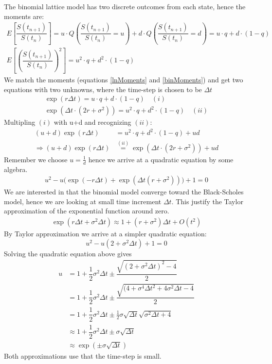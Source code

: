 The binomial lattice model has two discrete outcomes from each state, hence the moments are:
\begin{equation}\label{binMoments}
\begin{split}
E[\dfrac{S(t_{n+1})}{S(t_{n})}]=u \cdot Q(\dfrac{S(t_{n+1})}{S(t_{n})} = u) + d \cdot Q(\dfrac{S(t_{n+1})}{S(t_{n})} = d) = u \cdot q + d \cdot (1-q)\\
E[(\dfrac{S(t_{n+1})}{S(t_{n})})^2]=u^2 \cdot q + d^2 \cdot (1-q)
\end{split}
\end{equation}
We match the moments (equations \eqref{lnMoments} and \eqref{binMoments}) and get two equations with two unknowns, where the time-step is chosen to be $\Delta t$
\begin{align*}
\exp(r \Delta t)=u \cdot q + d \cdot (1-q) \quad (i)\\
\exp(\Delta t \cdot (2r + \sigma^2))=u^2 \cdot q + d^2 \cdot (1-q) \quad (ii)
\end{align*}
Multipling $(i)$ with u+d and recognizing $(ii)$:
\begin{align*}
(u+d)\exp(r \Delta t)&=u^2 \cdot q + d^2 \cdot (1-q) + ud\\
\Rightarrow (u+d)\exp(r \Delta t)&\overset{(ii)}{=}\exp(\Delta t \cdot (2r + \sigma^2)) + u d
\end{align*}
Remember we choose $u= \frac{1}{d}$ hence we arrive at a quadratic equation by some algebra.
\begin{align*}
u^2 - u\bigg(\exp(-r \Delta t) + \exp(\Delta t(r+\sigma^2))\bigg)+1=0
\end{align*}
We are interested in that the binomial model converge toward the Black-Scholes model, hence we are looking at small time increment $\Delta t$. This justify the Taylor approximation of the exponential function around zero.
\begin{align*}
\exp(r \Delta t + \sigma^2 \Delta t) \approx 1 + (r+\sigma^2)\Delta t + O(t^2)
\end{align*}
By Taylor approximation we arrive at a simpler quadratic equation:
\begin{equation*}
u^2-u(2+\sigma^2 \Delta t) + 1 = 0
\end{equation*}
Solving the quadratic equation above gives
\begin{align*}
u&=1+\dfrac{1}{2} \sigma^2 \Delta t \pm  \dfrac{\sqrt{(2+\sigma^2 \Delta t)^2 - 4}}{2}\\
&=1+\dfrac{1}{2} \sigma^2 \Delta t \pm  \dfrac{\sqrt{(4+\sigma^4 \Delta t^2 + 4 \sigma^2 \Delta t - 4}}{2}\\
&=1+\dfrac{1}{2} \sigma^2 \Delta t \pm \frac{1}{2} \sigma \sqrt{\Delta t} \sqrt{\sigma^2 \Delta t + 4}\\
&\approx 1+\dfrac{1}{2} \sigma^2 \Delta t \pm \sigma \sqrt{\Delta t}\\
&\approx \exp(\pm \sigma \sqrt{\Delta t})
\end{align*}
Both approximations use that the time-step is small.

